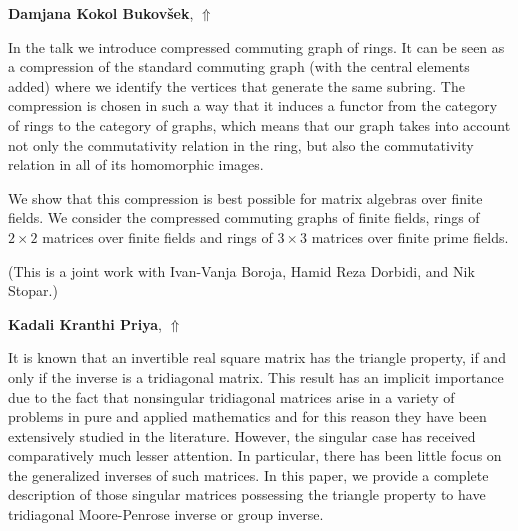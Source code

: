 \documentclass[ILAS2025-program.tex]{subfiles}
\begin{document}
\hypertarget{down0416}{}\begin{ilasabstract}
    
\textbf{Damjana Kokol Bukovšek},  \hfill \hyperlink{up0416}{$\Uparrow$}
    
    
\mtskip
    In the talk we introduce compressed commuting graph of rings. It can be seen as a compression of the standard commuting graph (with the central elements added) where we identify the vertices that generate the same subring. The compression is chosen in such a way that it induces a functor from the category of rings to the category of graphs, which means that our graph takes into account not only the commutativity relation in the ring, but also the commutativity relation in all of its homomorphic images. 

We show that this compression is best possible for matrix algebras over finite fields. We consider the compressed commuting graphs of finite fields, rings of $2 \times 2$ matrices over finite fields and rings of $3 \times 3$ matrices over finite prime fields.

(This is a joint work with Ivan-Vanja Boroja, Hamid Reza Dorbidi, and Nik Stopar.)
\end{ilasabstract}
    

\hypertarget{down0085}{}\begin{ilasabstract}
    
\textbf{Kadali Kranthi Priya},  \hfill \hyperlink{up0085}{$\Uparrow$}
    
    
\mtskip
    It is known that an invertible real square matrix has the triangle property, if and only if the inverse is a tridiagonal matrix.
This result has an implicit importance due to the fact that nonsingular tridiagonal matrices arise in a variety of problems in pure and applied mathematics and for this reason they have been extensively studied in the literature. However, the singular case has received comparatively much lesser attention. In particular, there has been little focus on the generalized inverses of such matrices.  In this paper, we provide a complete description of those singular matrices possessing the triangle property to have tridiagonal Moore-Penrose inverse or group inverse.



\end{ilasabstract}
    
\end{document}
